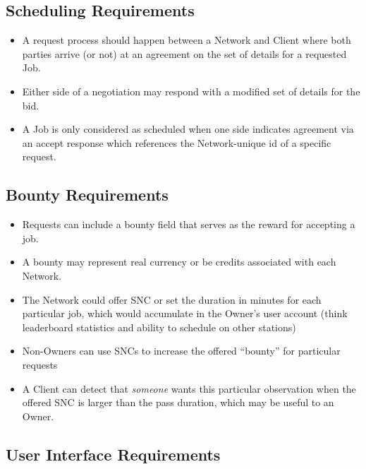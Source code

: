 \documentclass{article}
\begin{document}
\subsection{Scheduling Requirements}

\begin{itemize}
    \item A request process should happen between a Network and Client where both parties arrive (or not) at an agreement on the set of details for a requested Job.
	\item Either side of a negotiation may respond with a modified set of details for the bid.
	\item A Job is only considered as scheduled when one side indicates agreement via an accept response which references the Network-unique id of a specific request.
\end{itemize}

\subsection{Bounty Requirements}

\begin{itemize}
    \item Requests can include a bounty field that serves as the reward for accepting a job.
	\item A bounty may represent real currency or be credits associated with each Network.
	\item The Network could offer SNC or set the duration in minutes for each particular job, which would accumulate in the Owner's user account (think leaderboard statistics and ability to schedule on other stations)
	\item Non-Owners can use SNCs to increase the offered ``bounty'' for particular requests
	\item A Client can detect that \textit{someone} wants this particular observation when the offered SNC is larger than the pass duration, which may be useful to an Owner.
\end{itemize}

\subsection{User Interface Requirements}
\end{document}
